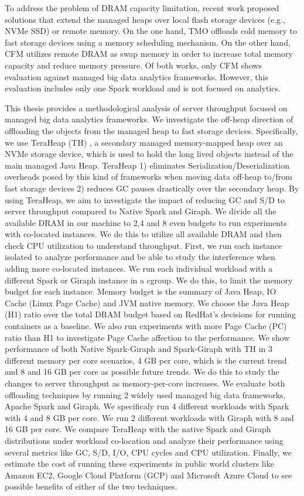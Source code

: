 To address the problem of DRAM capacity limitation, recent work
proposed solutions that extend the managed heaps over local flash
storage devices (e.g., NVMe SSD) or remote memory. On the one hand,
TMO \cite{TMO} offloads cold memory to fast storage devices using
a memory scheduling mechanism. On the other hand, CFM \cite{CFM}
utilizes remote DRAM as swap memory in order to increase total memory capacity
and reduce memory pressure. Of both works, only CFM shows
evaluation against managed big data analytics frameworks. However, this evaluation
includes only one Spark workload and is not focused on analytics.

This thesis provides a methodological analysis of server throughput 
focused on managed big data analytics frameworks.
We investigate the off-heap direction of offloading the objects from the
managed heap to fast storage devices.
Specifically, we use TeraHeap (TH) \cite{TeraHeap}, a secondary managed
memory-mapped heap over an NVMe storage device, which is used to hold
the long lived objects instead of the main managed Java Heap. TeraHeap
1) eliminates Serialization/Deserialization overheads posed by this
kind of frameworks when moving data off-heap to/from fast storage
devices 2) reduces GC pauses drastically over the secondary heap. By
using TeraHeap, we aim to investigate the impact of reducing GC and S/D
to server throughput compared to Native Spark and Giraph. We divide all the available DRAM
in our machine to 2,4 and 8 even budgets to run experiments with co-located instances.
We do this to utilize all available DRAM and then check CPU utilization to understand throughput.
First, we run each instance isolated to analyze performance and be able to study the interference when adding more
co-located instances. We run each individual workload with a different Spark or Giraph instance in a cgroup.
We do this, to limit the memory budget for each instance. Memory budget is
the summary of Java Heap, IO Cache (Linux Page Cache) and JVM native memory. We choose
the Java Heap (H1) ratio over the total DRAM budget based on RedHat's decisions
for running containers as a baseline. We also run experiments with more Page Cache (PC) ratio than H1
to investigate Page Cache affection to the performance. We show performance of both Native Spark-Giraph and Spark-Giraph with TH in 3 different
memory per core scenarios, 4 GB per core, which is the current trend and 8 and 16 GB per core 
as possible future trends. We do this to study the changes to server throughput as memory-per-core increases. 
We evaluate both offloading techniques by running 2 widely used
managed big data frameworks, Apache Spark and Giraph. We
specificaly run 4 different workloads with Spark with 4 and 8 GB per core.
We run 2 different workloads with Giraph with 8 and 16 GB per core.
We compare TeraHeap with the native Spark and Giraph distributions under workload
co-location and analyze their performance using several metrics like
GC, S/D, I/O, CPU cycles and CPU utilization. Finally, we estimate the cost of running these
experiments in public world clusters like Amazon EC2, Google Cloud Platform (GCP)
and Microsoft Azure Cloud to see possible benefits of either of the two techniques.

